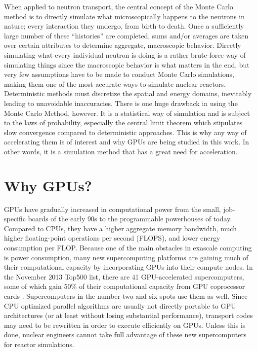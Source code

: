 When applied to neutron transport, the central concept of the Monte Carlo method is to directly simulate what  microscopically happens to the neutrons in nature; every interaction they undergo, from birth to death.  Once a sufficiently large number of these ``histories'' are completed, sums and/or averages are taken over certain attributes to determine aggregate, macroscopic behavior.  Directly simulating what every individual neutron is doing is a rather brute-force way of simulating things since the macroscopic behavior is what matters in the end, but very few assumptions have to be made to conduct Monte Carlo simulations, making them one of the most accurate ways to simulate nuclear reactors.  Deterministic methods must discretize the spatial and energy domains, inevitably leading to unavoidable inaccuracies.  There is one huge drawback in using the Monte Carlo Method, however.  It is a statistical way of simulation and is subject to the laws of probability, especially the central limit theorem which stipulates slow convergence compared to deterministic approaches.  This is why any way of accelerating them is of interest and why GPUs are being studied in this work.  In other words, it is a simulation method that has a great need for acceleration. 

\section{Why GPUs?}

GPUs have gradually increased in computational power from the small, job-specific boards of the early 90s to the programmable powerhouses of today.  Compared to CPUs, they have a higher aggregate memory bandwidth, much higher floating-point operations per second (FLOPS), and lower energy consumption per FLOP.  Because one of the main obstacles in exascale computing is power consumption, many new supercomputing platforms are gaining much of their computational capacity by incorporating GPUs into their compute nodes.  In the November 2013 Top500 list, there are 41 GPU-accelerated supercomputers, some of which gain 50\% of their computational capacity from GPU coprocessor cards \cite{top500}.  Supercomputers in the number two and six spots use them as well.  Since CPU optimized parallel algorithms are usually not directly portable to GPU architectures (or at least without losing substantial performance), transport codes may need to be rewritten in order to execute efficiently on GPUs.  Unless this is done, nuclear engineers cannot take full advantage of these new supercomputers for reactor simulations.


